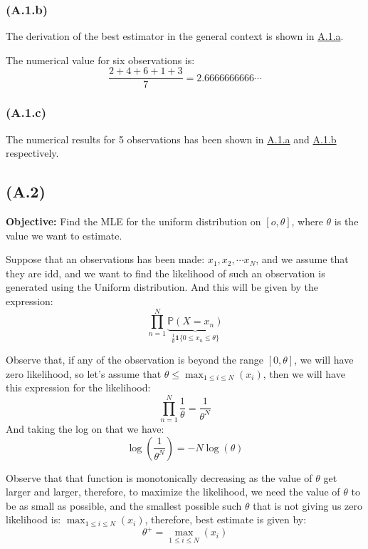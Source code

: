\documentclass[]{article}
\begin{document}
        \subsubsection*{(A.1.b)}\label{A.1.b}
            \hspace{1.1em}
            The derivation of the best estimator in the general context is shown in \hyperref[A.1.a]{A.1.a}. 
            \par
            The numerical value for six observations is: 
            $$
                \frac{2 + 4 + 6 + 1 + 3}{7} = 2.6666666666\cdots
            $$
        \subsubsection*{(A.1.c)}
            The numerical results for 5 observations has been shown in \hyperref[A.1.a]{A.1.a} and \hyperref[A.1.b]{A.1.b} respectively. 
            
    \subsection*{(A.2)}
        \hspace{1.1em}
        \textbf{Objective: } Find the MLE for the uniform distribution on $[o, \theta]$, where $\theta$ is the value we want to estimate.
        \par
        Suppose that an observations has been made: $x_1, x_2, \cdots x_N$, and we assume that they are idd, and we want to find the likelihood of such an observation is generated using the Uniform distribution. And this will be given by the expression: 
        \begin{equation*}\tag{A.2.1}\label{eqn:A.2.1}
            \prod_{n = 1}^{N} 
            \underbrace{
            \mathbb{P}\left(X = x_n\right)}_{\frac{1}{\theta}\mathbf{1}\{0 \le x_n \le \theta\}}
        \end{equation*}
        \par
        Observe that, if any of the observation is beyond the range $[0, \theta]$, we will have zero likelihood, so let's assume that $\theta \le \max_{1\le i \le N}(x_i)$, then we will have this expression for the likelihood: 
        \begin{equation*}\tag{A.2.2}\label{eqn:A.2.2}
            \prod_{n = 1}^{N} 
            \frac{1}{\theta} = \frac{1}{\theta^N}
        \end{equation*}
        And taking the log on that we have: 
        \begin{equation*}\tag{A.2.3}\label{eqn:A.2.3}
            \log\left(\frac{1}{\theta^N}\right) = -N\log(\theta)
        \end{equation*}
        \par
        Observe that that function is monotonically decreasing as the value of $\theta$ get larger and larger, therefore, to maximize the likelihood, we need the value of $\theta$ to be as small as possible, and the smallest possible such $\theta$ that is not giving us zero likelihood is: $\max_{1\le i \le N}(x_i)$, therefore, best estimate is given by: 
        $$
            \theta^+ =\max_{1\le i \le N}(x_i)
        $$
\end{document}
